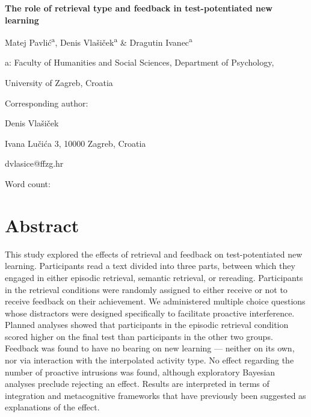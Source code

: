 \documentclass[12pt]{article}
\def\biblio{}
\begin{document}
\begin{titlepage}
    \begin{center}

        \vspace*{\fill}

        \Large
        \textbf{The role of retrieval type and feedback in test-potentiated 
        new learning}
        \normalsize

        \bigskip
        Matej Pavlić\textsuperscript{a}, Denis Vlašiček\textsuperscript{a}  
        \& Dragutin Ivanec\textsuperscript{a}

        a: Faculty of Humanities and Social Sciences, Department of 
        Psychology, 
        
        University of Zagreb, Croatia

        \bigskip

        \raggedright
        Corresponding author:

        Denis Vlašiček

        Ivana Lučića 3, 10000 Zagreb, Croatia

        dvlasice@ffzg.hr

		\bigskip
		Word count:
		
        \vspace*{\fill}

    \end{center}

\end{titlepage}

\def\biblio{}

\section{Abstract}

This study explored the effects of retrieval and feedback on 
test-potentiated new learning. Participants read a text divided into three 
parts, between which they engaged in either episodic retrieval, semantic 
retrieval, or rereading. Participants in the retrieval conditions were 
randomly assigned to either receive or not to receive feedback on their 
achievement. We administered multiple choice questions whose distractors 
were designed specifically to facilitate proactive interference. Planned 
analyses showed that participants in the episodic retrieval condition scored 
higher on the final test than participants in the other two groups. Feedback 
was found to have no bearing on new learning --- neither on its own, nor via 
interaction with the interpolated activity type. No effect regarding the 
number of proactive intrusions was found, although exploratory Bayesian 
analyses preclude rejecting an effect. Results are interpreted in terms of 
integration and metacognitive frameworks that have previously been suggested 
as explanations of the effect.
\end{document}
